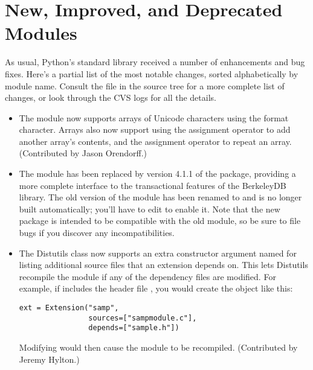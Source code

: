\documentclass{howto}
\begin{document}
\section{New, Improved, and Deprecated Modules}

As usual, Python's standard library received a number of enhancements and
bug fixes.  Here's a partial list of the most notable changes, sorted
alphabetically by module name. Consult the
 file in the source tree for a more
complete list of changes, or look through the CVS logs for all the
details.

\begin{itemize}

\item The  module now supports arrays of Unicode
characters using the  format character.  Arrays also now
support using the \code{+=} assignment operator to add another array's
contents, and the \code{*=} assignment operator to repeat an array.
(Contributed by Jason Orendorff.)

\item The  module has been replaced by version 4.1.1
of the  package,
providing a more complete interface to the transactional features of
the BerkeleyDB library.
The old version of the module has been renamed to 
 and is no longer built automatically; you'll 
have to edit  to enable it.  Note that the new
 package is intended to be compatible with the 
old module, so be sure to file bugs if you discover any
incompatibilities.
 
\item The Distutils  class now supports
an extra constructor argument named  for listing
additional source files that an extension depends on.  This lets
Distutils recompile the module if any of the dependency files are
modified.  For example, if  includes the header
file , you would create the  object like
this:

\begin{verbatim}
ext = Extension("samp",
                sources=["sampmodule.c"],
                depends=["sample.h"])
\end{verbatim}

Modifying  would then cause the module to be recompiled.
(Contributed by Jeremy Hylton.)


\end{itemize}
\end{document}
